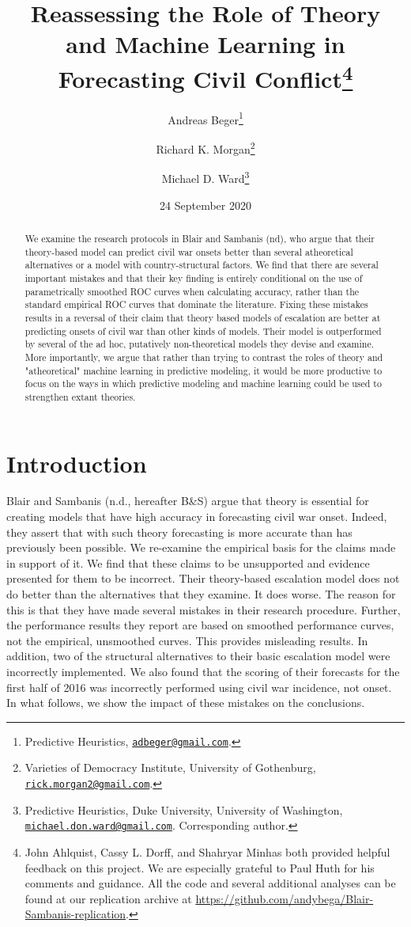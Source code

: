 \documentclass[
]{article}
\title{Reassessing the Role of Theory and Machine Learning in Forecasting Civil Conflict\thanks{John Ahlquist, Cassy L. Dorff, and Shahryar Minhas both provided helpful feedback on this project. We are especially grateful to Paul Huth for his comments and guidance. All the code and several additional analyses can be found at our replication archive at \url{https://github.com/andybega/Blair-Sambanis-replication}.}}
\author{Andreas Beger\footnote{Predictive Heuristics, \href{mailto:adbeger@gmail.com}{\nolinkurl{adbeger@gmail.com}}.} \and Richard K. Morgan\footnote{Varieties of Democracy Institute, University of Gothenburg, \href{mailto:rick.morgan2@gmail.com}{\nolinkurl{rick.morgan2@gmail.com}}.} \and Michael D. Ward\footnote{Predictive Heuristics, Duke University, University of Washington, \href{mailto:michael.don.ward@gmail.com}{\nolinkurl{michael.don.ward@gmail.com}}. Corresponding author.}}
\date{24 September 2020}
\begin{document}
\maketitle
\begin{abstract}
We examine the research protocols in Blair and Sambanis (nd), who argue that their theory-based model can predict civil war onsets better than several atheoretical alternatives or a model with country-structural factors. We find that there are several important mistakes and that their key finding is entirely conditional on the use of parametrically smoothed ROC curves when calculating accuracy, rather than the standard empirical ROC curves that dominate the literature. Fixing these mistakes results in a reversal of their claim that theory based models of escalation are better at predicting onsets of civil war than other kinds of models. Their model is outperformed by several of the ad hoc, putatively non-theoretical models they devise and examine. More importantly, we argue that rather than trying to contrast the roles of theory and "atheoretical" machine learning in predictive modeling, it would be more productive to focus on the ways in which predictive modeling and machine learning could be used to strengthen extant theories.
\end{abstract}

\hypertarget{introduction}{%
\section{Introduction}\label{introduction}}

Blair and Sambanis (n.d., hereafter B\&S) argue that theory is essential for creating models that have high accuracy in forecasting civil war onset. Indeed, they assert that with such theory forecasting is more accurate than has previously been possible. We re-examine the empirical basis for the claims made in support of it. We find that these claims to be unsupported and evidence presented for them to be incorrect. Their theory-based escalation model does not do better than the alternatives that they examine. It does worse. The reason for this is that they have made several mistakes in their research procedure. Further, the performance results they report are based on smoothed performance curves, not the empirical, unsmoothed curves. This provides misleading results. In addition, two of the structural alternatives to their basic escalation model were incorrectly implemented. We also found that the scoring of their forecasts for the first half of 2016 was incorrectly performed using civil war incidence, not onset. In what follows, we show the impact of these mistakes on the conclusions.
\end{document}
